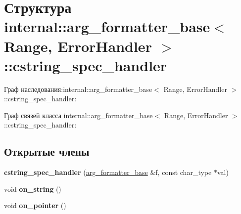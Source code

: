 \hypertarget{structinternal_1_1arg__formatter__base_1_1cstring__spec__handler}{}\section{Структура internal\+:\+:arg\+\_\+formatter\+\_\+base$<$ Range, Error\+Handler $>$\+:\+:cstring\+\_\+spec\+\_\+handler}
\label{structinternal_1_1arg__formatter__base_1_1cstring__spec__handler}


Граф наследования\+:internal\+:\+:arg\+\_\+formatter\+\_\+base$<$ Range, Error\+Handler $>$\+:\+:cstring\+\_\+spec\+\_\+handler\+:


Граф связей класса internal\+:\+:arg\+\_\+formatter\+\_\+base$<$ Range, Error\+Handler $>$\+:\+:cstring\+\_\+spec\+\_\+handler\+:
\subsection*{Открытые члены}
\begin{DoxyCompactItemize}
\item 
\mbox{\label{structinternal_1_1arg__formatter__base_1_1cstring__spec__handler_a9496e8807f044214f3c7d2f78985c2f0}} 
{\bfseries cstring\+\_\+spec\+\_\+handler} (\hyperlink{classinternal_1_1arg__formatter__base}{arg\+\_\+formatter\+\_\+base} \&f, const char\+\_\+type $\ast$val)
\item 
\mbox{\label{structinternal_1_1arg__formatter__base_1_1cstring__spec__handler_a087cd3e3b1bdf268986f541a7ff4936b}} 
void {\bfseries on\+\_\+string} ()
\item 
\mbox{\label{structinternal_1_1arg__formatter__base_1_1cstring__spec__handler_ac332146a3c0ceca84003e27b571da0f9}} 
void {\bfseries on\+\_\+pointer} ()
\end{DoxyCompactItemize}
